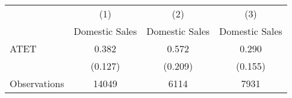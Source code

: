 \begin{tabular}{l*{3}{c}}
\hline\hline
                    &\multicolumn{1}{c}{(1)}&\multicolumn{1}{c}{(2)}&\multicolumn{1}{c}{(3)}\\
                    &\multicolumn{1}{c}{Domestic Sales}&\multicolumn{1}{c}{Domestic Sales}&\multicolumn{1}{c}{Domestic Sales}\\
\hline
ATET                &       0.382&       0.572&       0.290\\
                    &     (0.127)&     (0.209)&     (0.155)\\
\hline
Observations        &       14049&        6114&        7931\\
\hline\hline
\end{tabular}
